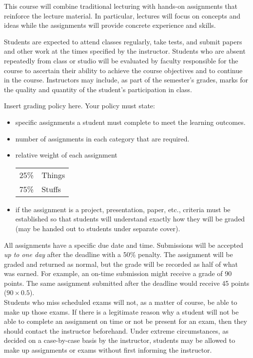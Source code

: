 \documentclass{neu_syllabus}
\begin{document}
This course will combine traditional lecturing with hands-on assignments that reinforce the lecture material.
In particular, lectures will focus on concepts and ideas while the assignments will provide concrete experience and skills.

Students are expected to attend classes regularly, take tests, and submit papers and other work at the times specified by the instructor.
Students who are absent repeatedly from class or studio will be evaluated by faculty responsible for the course to ascertain their ability to achieve the course objectives and to continue in the course.
Instructors may include, as part of the semester's grades, marks for the quality and quantity of the student's participation in class.

Insert grading policy here.  Your policy must state:
\begin{itemize}
\item specific assignments a student must complete to meet the learning outcomes.
\item number of assignments in each category that are required.
\item{%
relative weight of each assignment \\
\begin{tabular}{ p{1.0cm} l }
	25\% & Things \\
	75\% & Stuffs \\
\end{tabular}
}
\item if the assignment is a project, presentation, paper, etc., criteria must be established so that students will understand exactly how they will be graded (may be handed out to students under separate cover).
\end{itemize}


All assignments have a specific due date and time.
Submissions will be accepted \textit{up to one day} after the deadline with a 50\% penalty.
The assignment will be graded and returned as normal, but the grade will be recorded as half of what was earned.
For example, an on-time submission might receive a grade of 90 points.
The same assignment submitted after the deadline would receive 45 points ($90 \times 0.5$).
\\

Students who miss scheduled exams will not, as a matter of course, be able to make up those exams.
If there is a legitimate reason why a student will not be able to complete an assignment on time or not be present for an exam, then they should contact the instructor beforehand.
Under extreme circumstances, as decided on a case-by-case basis by the instructor, students may be allowed to make up assignments or exams without first informing the instructor.
\end{document}
